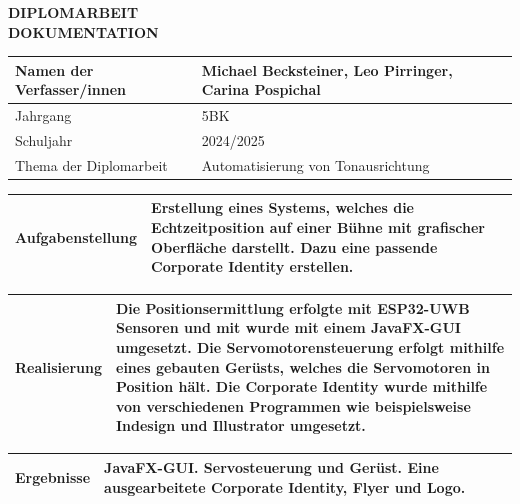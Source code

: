 \begin{center}
 \LARGE \textbf{DIPLOMARBEIT}\\
 \Large \textbf{DOKUMENTATION}\\
 \normalsize
\end{center}


\newlength{\feldC}
\newlength{\feldD}

\linespread{1.1} \normalsize
\begin{tabular}{|p{\feldC}|p{\feldD}|}
 \hline
 Namen der Verfasser/innen & Michael Becksteiner, Leo Pirringer, Carina Pospichal\\ 
 \hline 
 Jahrgang & 5BK \\ Schuljahr & 2024/2025 \\
 \hline
 Thema der Diplomarbeit & Automatisierung von Tonausrichtung\\
 \hline
\end{tabular}

\begin{tabular}{|p{\feldC}|p{\feldD}|}
 \hline
 Aufgabenstellung & Erstellung eines Systems, welches die Echtzeitposition auf einer Bühne mit grafischer Oberfläche darstellt. Dazu eine passende Corporate Identity erstellen. \\
 \hline
\end{tabular}

\begin{tabular}{|p{\feldC}|p{\feldD}|}
 \hline
 Realisierung & Die Positionsermittlung erfolgte mit ESP32-UWB Sensoren und mit wurde mit einem JavaFX-GUI umgesetzt. Die Servomotorensteuerung erfolgt mithilfe eines gebauten Gerüsts, welches die Servomotoren in Position hält. Die Corporate Identity wurde mithilfe von verschiedenen Programmen wie beispielsweise Indesign und Illustrator umgesetzt.\\
 \hline
\end{tabular}

\begin{tabular}{|p{\feldC}|p{\feldD}|}
 \hline
 Ergebnisse & JavaFX-GUI. Servosteuerung und Gerüst. Eine ausgearbeitete Corporate Identity, Flyer und Logo.\\
 \hline
\end{tabular}

